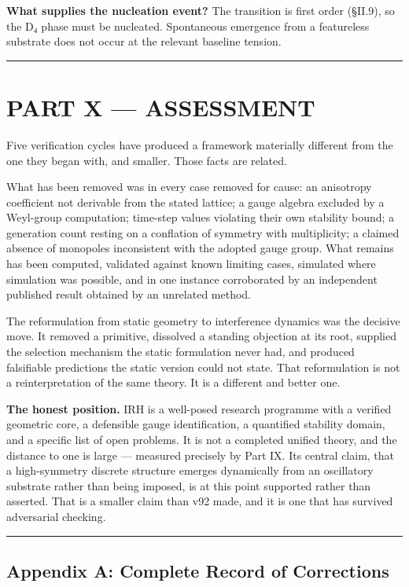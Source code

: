 \documentclass[a4paper,11pt]{article}
\begin{document}
\textbf{What supplies the nucleation event?} The transition is first order (§II.9), so the D₄ phase must be nucleated. Spontaneous emergence from a featureless substrate does not occur at the relevant baseline tension.

\medskip\hrule\medskip

\section*{PART X — ASSESSMENT}

Five verification cycles have produced a framework materially different from the one they began with, and smaller. Those facts are related.

What has been removed was in every case removed for cause: an anisotropy coefficient not derivable from the stated lattice; a gauge algebra excluded by a Weyl-group computation; time-step values violating their own stability bound; a generation count resting on a conflation of symmetry with multiplicity; a claimed absence of monopoles inconsistent with the adopted gauge group. What remains has been computed, validated against known limiting cases, simulated where simulation was possible, and in one instance corroborated by an independent published result obtained by an unrelated method.

The reformulation from static geometry to interference dynamics was the decisive move. It removed a primitive, dissolved a standing objection at its root, supplied the selection mechanism the static formulation never had, and produced falsifiable predictions the static version could not state. That reformulation is not a reinterpretation of the same theory. It is a different and better one.

\textbf{The honest position.} IRH is a well-posed research programme with a verified geometric core, a defensible gauge identification, a quantified stability domain, and a specific list of open problems. It is not a completed unified theory, and the distance to one is large — measured precisely by Part IX. Its central claim, that a high-symmetry discrete structure emerges dynamically from an oscillatory substrate rather than being imposed, is at this point supported rather than asserted. That is a smaller claim than v92 made, and it is one that has survived adversarial checking.

\medskip\hrule\medskip

\subsection*{Appendix A: Complete Record of Corrections}
\end{document}

